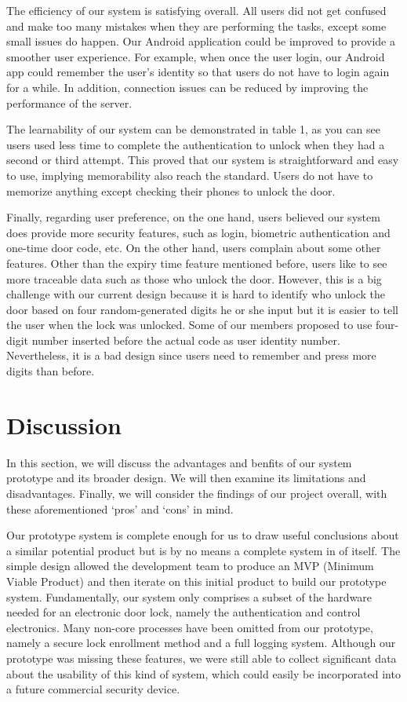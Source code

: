 \documentclass[conference]{IEEEtran}
\begin{document}
The efficiency of our system is satisfying overall. All users did not get confused and make too many mistakes when they are performing the tasks, except some small issues do happen. Our Android application could be improved to provide a smoother user experience. For example, when once the user login, our Android app could remember the user’s identity so that users do not have to login again for a while. In addition, connection issues can be reduced by improving the performance of the server.

The learnability of our system can be demonstrated in table 1, as you can see users used less time to complete the authentication to unlock when they had a second or third attempt. This proved that our system is straightforward and easy to use, implying memorability also reach the standard. Users do not have to memorize anything except checking their phones to unlock the door.

Finally, regarding user preference, on the one hand, users believed our system does provide more security features, such as login, biometric authentication and one-time door code, etc. On the other hand, users complain about some other features. Other than the expiry time feature mentioned before, users like to see more traceable data such as those who unlock the door. However, this is a big challenge with our current design because it is hard to identify who unlock the door based on four random-generated digits he or she input but it is easier to tell the user when the lock was unlocked. Some of our members proposed to use four-digit number inserted before the actual code as user identity number. Nevertheless, it is a bad design since users need to remember and press more digits than before.

\section{Discussion}
In this section, we will discuss the advantages and benfits of our system prototype and its broader design.
We will then examine its limitations and disadvantages.
Finally, we will consider the findings of our project overall, with these aforementioned `pros' and `cons' in mind.

Our prototype system is complete enough for us to draw useful conclusions about a similar potential product but is by no means a complete system in of itself.
The simple design allowed the development team to produce an MVP (Minimum Viable Product) and then iterate on this initial product to build our prototype system.
Fundamentally, our system only comprises a subset of the hardware needed for an electronic door lock, namely the authentication and control electronics.
Many non-core processes have been omitted from our prototype, namely a secure lock enrollment method and a full logging system.
Although our prototype was missing these features, we were still able to collect significant data about the usability of this kind of system, which could easily be incorporated into a future commercial security device.
\end{document}
